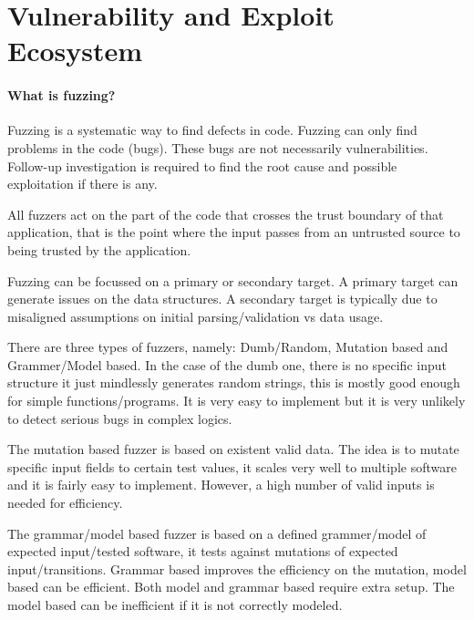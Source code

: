 \section{Vulnerability and Exploit Ecosystem}
\paragraph{What is fuzzing?}
Fuzzing is a systematic way to find defects in code. Fuzzing can only find problems in the code (bugs). These bugs are not necessarily vulnerabilities. Follow-up investigation is required to find the root cause and possible exploitation if there is any.

All fuzzers act on the part of the code that crosses the trust boundary of that application, that is the point where the input passes from an untrusted source to being trusted by the application.

Fuzzing can be focussed on a primary or secondary target. A primary target can generate issues on the data structures. A secondary target is typically due to misaligned assumptions on initial parsing/validation vs data usage.

There are three types of fuzzers, namely: Dumb/Random, Mutation based and Grammer/Model based. In the case of the dumb one, there is no specific input structure it just mindlessly generates random strings, this is mostly good enough for simple functions/programs. It is very easy to implement but it is very unlikely to detect serious bugs in complex logics.

The mutation based fuzzer is based on existent valid data. The idea is to mutate specific input fields to certain test values, it scales very well to multiple software and it is fairly easy to implement. However, a high number of valid inputs is needed for efficiency.

The grammar/model based fuzzer is based on a defined grammer/model of expected input/tested software, it tests against mutations of expected input/transitions. Grammar based improves the efficiency on the mutation, model based can be efficient. Both model and grammar based require extra setup. The model based can be inefficient if it is not correctly modeled.